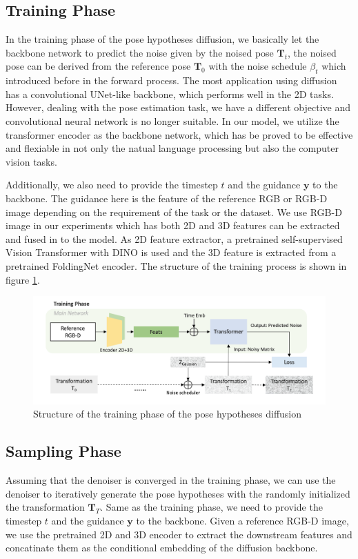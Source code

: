\documentclass[12pt,DIV14,BCOR12mm,a4paper,footinclude=false,headinclude,parskip=half-,twoside,openright,cleardoublepage=empty,toc=index,bibliography=totoc,listof=totoc]{scrreprt}
\numberwithin{equation}{chapter}
\begin{document}
\subsection{Training Phase}
In the training phase of the pose hypotheses diffusion, we basically let the backbone network to predict the noise given by the noised pose $\mathbf{T}_{t}$, the noised pose can be derived from the reference pose $\mathbf{T}_{0}$ with the noise schedule $\beta_{t}$ which introduced before in the forward process. The most application using diffusion has a convolutional UNet-like backbone\cite{ronneberger2015unet}, which performs well in the 2D tasks. However, dealing with the pose estimation task, we have a different objective and convolutional neural network is no longer suitable. In our model, we utilize the transformer encoder as the backbone network, which has be proved to be effective and flexiable in not only the natual language processing but also the computer vision tasks.

Additionally, we also need to provide the timestep $t$ and the guidance $\mathbf{y}$ to the backbone. The guidance here is the feature of the reference RGB or RGB-D image depending on the requirement of the task or the dataset. We use RGB-D image in our experiments which has both 2D and 3D features can be extracted and fused in to the model. As 2D feature extractor, a pretrained self-supervised Vision Transformer
 with DINO\cite{caron2021emerging} is used and the 3D feature is extracted from a pretrained FoldingNet encoder\cite{yang2018foldingnet}. The structure of the training process is shown in figure \ref{img:train}.

\begin{figure}[h]
	\centering
	\includegraphics[scale=.23]{img/train.png}
	\caption{Structure of the training phase of the pose hypotheses diffusion}
	\label{img:train}
\end{figure}

\subsection{Sampling Phase}
Assuming that the denoiser is converged in the training phase, we can use the denoiser to iteratively generate the pose hypotheses with the randomly initialized the transformation $\mathbf{T}_{T}$. Same as the training phase, we need to provide the timestep $t$ and the guidance $\mathbf{y}$ to the backbone. Given a reference RGB-D image, we use the pretrained 2D and 3D encoder to extract the downstream features and concatinate them as the conditional embedding of the diffusion backbone. 
\end{document}
